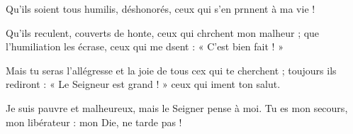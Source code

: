 \item Qu’ils soient tous humilis, déshonorés, ceux qui s’en prnnent à ma vie !
\item Qu’ils reculent, couverts de honte, ceux qui chrchent mon malheur ;\psstar{} que l’humiliation les écrase, ceux qui me dsent : « C’est bien fait ! »
\item Mais tu seras l’allégresse et la joie de tous cex qui te cherchent ;\psstar{} toujours ils rediront : « Le Seigneur est grand ! » ceux qui iment ton salut.
\item Je suis pauvre et malheureux, mais le Seigner pense à moi.\psstar{} Tu es mon secours, mon libérateur : mon Die, ne tarde pas !
